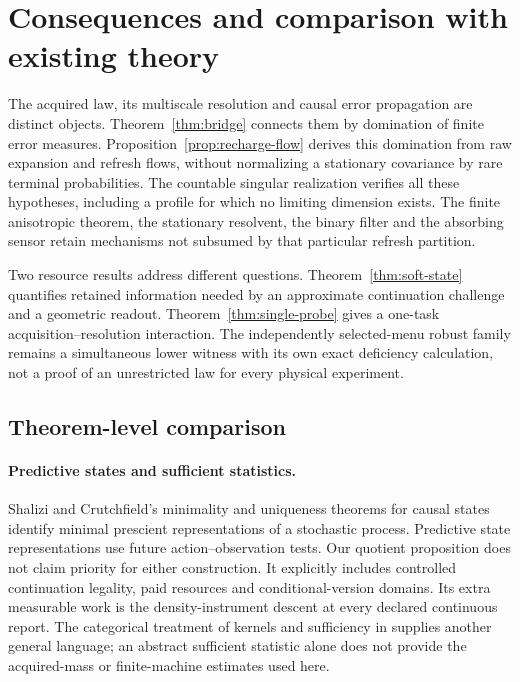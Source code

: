 \section{Consequences and comparison with existing theory}\label{sec:scope}
The acquired law, its multiscale resolution and causal error propagation are distinct objects. Theorem~\ref{thm:bridge} connects them by domination of finite error measures. Proposition~\ref{prop:recharge-flow} derives this domination from raw expansion and refresh flows, without normalizing a stationary covariance by rare terminal probabilities. The countable singular realization verifies all these hypotheses, including a profile for which no limiting dimension exists. The finite anisotropic theorem, the stationary resolvent, the binary filter and the absorbing sensor retain mechanisms not subsumed by that particular refresh partition.

Two resource results address different questions. Theorem~\ref{thm:soft-state} quantifies retained information needed by an approximate continuation challenge and a geometric readout. Theorem~\ref{thm:single-probe} gives a one-task acquisition--resolution interaction. The independently selected-menu robust family remains a simultaneous lower witness with its own exact deficiency calculation, not a proof of an unrestricted law for every physical experiment.

\subsection{Theorem-level comparison}
\paragraph{Predictive states and sufficient statistics.}
Shalizi and Crutchfield's minimality and uniqueness theorems for causal states \cite[Theorems 2--3]{shalizi} identify minimal prescient representations of a stochastic process. Predictive state representations \cite{psr} use future action--observation tests. Our quotient proposition does not claim priority for either construction. It explicitly includes controlled continuation legality, paid resources and conditional-version domains. Its extra measurable work is the density-instrument descent at every declared continuous report. The categorical treatment of kernels and sufficiency in \cite{fritz} supplies another general language; an abstract sufficient statistic alone does not provide the acquired-mass or finite-machine estimates used here.

